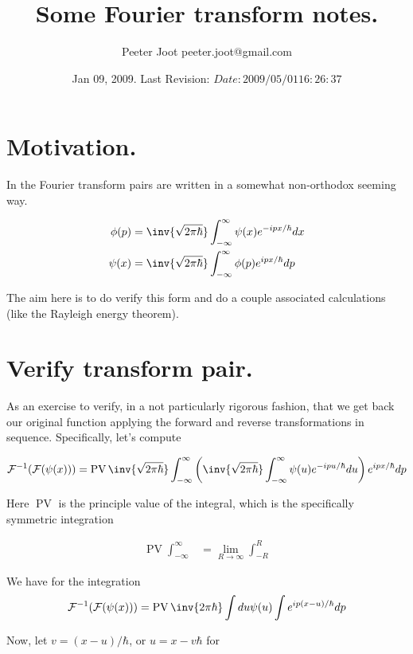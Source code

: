 \documentclass{article}
\title{ Some Fourier transform notes. }
\author{Peeter Joot \quad peeter.joot@gmail.com}
\date{ Jan 09, 2009.  Last Revision: $Date: 2009/05/01 16:26:37 $ }
\newcommand{\FF}[0]{\mathcal{F}}
\newcommand{\FM}[0]{\inv{\sqrt{2\pi\hbar}}}
\newcommand{\Iinf}[1]{ \int_{-\infty}^\infty {#1}}
\DeclareMathOperator{\PV}{PV}
\begin{document}
\maketitle{}
\tableofcontents

\section{ Motivation. }

In \cite{mcmahon2005qmd} the Fourier transform pairs are written in a somewhat 
non-orthodox seeming way.

\begin{align*}
\phi(p) &= \FM \Iinf{\psi(x) e^{-ipx/\hbar} dx} \\
\psi(x) &= \FM \Iinf{\phi(p) e^{ipx/\hbar} dp} \\
\end{align*}

The aim here is to do verify this form and do a couple associated calculations (like the Rayleigh energy theorem).

\section{ Verify transform pair. }

As an exercise to verify, in a not particularly rigorous fashion, that we get back our original function applying the forward and reverse transformations
in sequence.  Specifically, let's compute

\begin{align*}
\FF^{-1}(\FF(\psi(x)))
&= \PV \FM \Iinf{\left(\FM \Iinf{\psi(u) e^{-ipu/\hbar} du}\right) e^{ipx/\hbar} dp} \\
\end{align*}

Here $\PV$ is the principle value of the integral, which is the specifically symmetric integration

\begin{align*}
\PV \Iinf{} &= \lim_{R \rightarrow \infty} \int_{-R}^R
\end{align*}

We have for the integration
\begin{align*}
\FF^{-1}(\FF(\psi(x)))
&= \PV \inv{{2\pi\hbar}} \int du \psi(u) \int e^{i p (x-u)/\hbar} dp \\
\end{align*}

Now, let $v = (x-u)/\hbar$, or $u=x-v\hbar$ for
\end{document}
